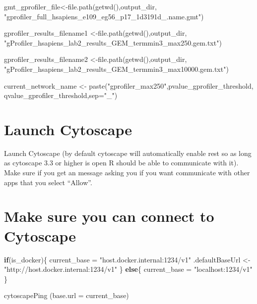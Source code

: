\documentclass[
]{book}
\newenvironment{Shaded}{\begin{snugshade}}{\end{snugshade}}
\newcommand{\AttributeTok}[1]{\textcolor[rgb]{0.77,0.63,0.00}{#1}}
\newcommand{\ControlFlowTok}[1]{\textcolor[rgb]{0.13,0.29,0.53}{\textbf{#1}}}
\newcommand{\FunctionTok}[1]{\textcolor[rgb]{0.00,0.00,0.00}{#1}}
\newcommand{\NormalTok}[1]{#1}
\newcommand{\OtherTok}[1]{\textcolor[rgb]{0.56,0.35,0.01}{#1}}
\newcommand{\StringTok}[1]{\textcolor[rgb]{0.31,0.60,0.02}{#1}}
\begin{document}
\begin{Shaded}
\begin{Highlighting}[]
\NormalTok{ gmt\_gprofiler\_file}\OtherTok{\textless{}{-}}\FunctionTok{file.path}\NormalTok{(}\FunctionTok{getwd}\NormalTok{(),output\_dir,}
                \StringTok{"gprofiler\_full\_hsapiens\_e109\_eg56\_p17\_1d3191d\_.name.gmt"}\NormalTok{)}

\NormalTok{gprofiler\_results\_filename1 }\OtherTok{\textless{}{-}}\FunctionTok{file.path}\NormalTok{(}\FunctionTok{getwd}\NormalTok{(),output\_dir,}
                \StringTok{"gProfiler\_hsapiens\_lab2\_results\_GEM\_termmin3\_max250.gem.txt"}\NormalTok{)}

\NormalTok{gprofiler\_results\_filename2 }\OtherTok{\textless{}{-}}\FunctionTok{file.path}\NormalTok{(}\FunctionTok{getwd}\NormalTok{(),output\_dir,}
                \StringTok{"gProfiler\_hsapiens\_lab2\_results\_GEM\_termmin3\_max10000.gem.txt"}\NormalTok{)}


\NormalTok{current\_network\_name }\OtherTok{\textless{}{-}} \FunctionTok{paste}\NormalTok{(}\StringTok{"gprofiler\_max250"}\NormalTok{,pvalue\_gprofiler\_threshold,}
\NormalTok{                              qvalue\_gprofiler\_threshold,}\AttributeTok{sep=}\StringTok{"\_"}\NormalTok{)}
\end{Highlighting}
\end{Shaded}

\hypertarget{launch-cytoscape}{%
\section{Launch Cytoscape}\label{launch-cytoscape}}

Launch Cytoscape (by default cytoscape will automatically enable rest so as long as cytoscape 3.3 or higher is open R should be able to communicate with it). Make sure if you get an message asking you if you want communicate with other apps that you select ``Allow''.

\hypertarget{make-sure-you-can-connect-to-cytoscape}{%
\section{Make sure you can connect to Cytoscape}\label{make-sure-you-can-connect-to-cytoscape}}

\begin{Shaded}
\begin{Highlighting}[]
\ControlFlowTok{if}\NormalTok{(is\_docker)\{}
\NormalTok{  current\_base }\OtherTok{=} \StringTok{"host.docker.internal:1234/v1"}
\NormalTok{  .defaultBaseUrl }\OtherTok{\textless{}{-}} \StringTok{"http://host.docker.internal:1234/v1"}
\NormalTok{\} }\ControlFlowTok{else}\NormalTok{\{}
\NormalTok{  current\_base }\OtherTok{=} \StringTok{"localhost:1234/v1"}
\NormalTok{\}}

\FunctionTok{cytoscapePing}\NormalTok{ (}\AttributeTok{base.url =}\NormalTok{ current\_base)}
\end{Highlighting}
\end{Shaded}
\end{document}
